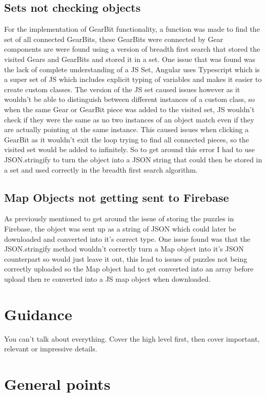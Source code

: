 \documentclass{l4proj}
\begin{document}
\subsection{Sets not checking objects}
For the implementation of GearBit functionality, a function was made to find the set of all connected GearBits, these GearBits were connected by Gear components are were found using a version of breadth first search that stored the visited Gears and GearBits and stored it in a set. One issue that was found was the lack of complete understanding of a JS Set, Angular uses Typescript which is a super set of JS which includes explicit typing of variables and makes it easier to create custom classes. The version of the JS set caused issues however as it wouldn't be able to distinguish between different instances of a custom class, so when the same Gear or GearBit piece was added to the visited set, JS wouldn't check if they were the same as no two instances of an object match even if they are actually pointing at the same instance. This caused issues when clicking a GearBit as it wouldn't exit the loop trying to find all connected pieces, so the visited set would be added to infinitely.  So to get around this error I had to use JSON.stringify to turn the object into a JSON string that could then be stored in a set and used correctly in the breadth first search algorithm. 

\subsection{Map Objects not getting sent to Firebase}
As previously mentioned to get around the issue of storing the puzzles in Firebase, the object was sent up as a string of JSON which could later be downloaded and converted into it's correct type. One issue found was that the JSON.stringify method wouldn't correctly turn a Map object into it's JSON counterpart so would just leave it out, this lead to issues of puzzles not being correctly uploaded so the Map object had to get converted into an array before upload then re converted into a JS map object when downloaded.

\section{Guidance}
You can't talk about everything. Cover the high level first, then cover important, relevant or impressive details.



\section{General points}
\end{document}
